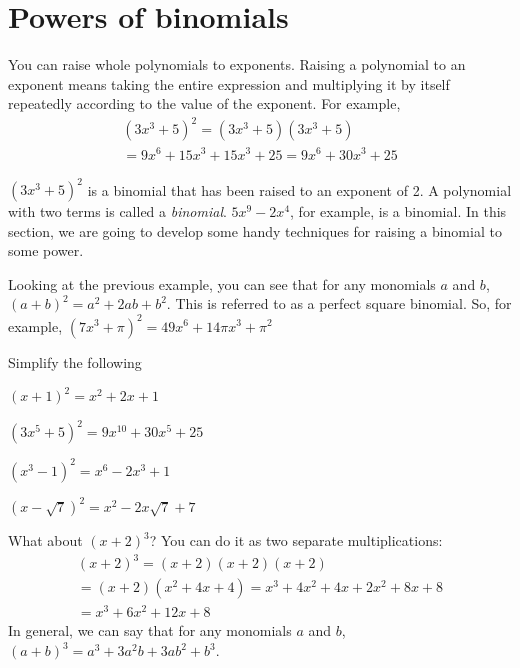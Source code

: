 \section{Powers of binomials}

You can raise whole polynomials to exponents. Raising a polynomial to an exponent means taking the entire expression and multiplying it by itself repeatedly according to the value of the exponent. For example, 
\begin{multline*}
  (3x^3 + 5)^2 = (3x^3 + 5)(3x^3 + 5) \\ = 9x^6 + 15x^3 + 15x^3 + 25 = 9x^6 + 30x^3 + 25 
\end{multline*}

$(3x^3 + 5)^2$ is a binomial that has been raised to an exponent of 2. A polynomial with two terms is called a \emph{binomial}. $5x^9 - 2x^4$,
for example, is a binomial. In this section, we are going to
develop some handy techniques for raising a binomial to some power.

Looking at the previous example, you can see that for any monomials $a$ and $b$,  
$(a + b)^2 = a^2 + 2ab + b^2.$ This is referred to as a perfect square binomial. 
So, for example, $(7x^3 + \pi)^2 = 49x^6 + 14\pi x^3 + \pi^2$

\begin{Exercise}[title={Squaring binomials}, label=squaringbinomials]
  Simplify the following
  
\end{Exercise}
\begin{Answer}[ref=squaringbinomials]
  $(x+1)^2 = x^2 + 2x + 1$

  $(3x^5 + 5)^2 = 9x^10 + 30x^5 + 25$

  $(x^3 - 1)^2 = x^6 - 2x^3 + 1$

  $(x - \sqrt{7})^2 = x^2 - 2x\sqrt{7} + 7$
\end{Answer}

What about $(x + 2)^3$? You can do it as two separate multiplications:
\begin{multline*}
  (x+2)^3 = (x+2)(x+2)(x+2) \\
  = (x + 2)(x^2 + 4x + 4) = x^3 + 4x^2 + 4x + 2x^2 + 8x + 8 \\
  = x^3 + 6x^2 + 12x + 8
\end{multline*}
In general, we can say that for any monomials $a$ and $b$, $(a + b)^3 = a^3 + 3a^2b + 3ab^2 + b^3$.

